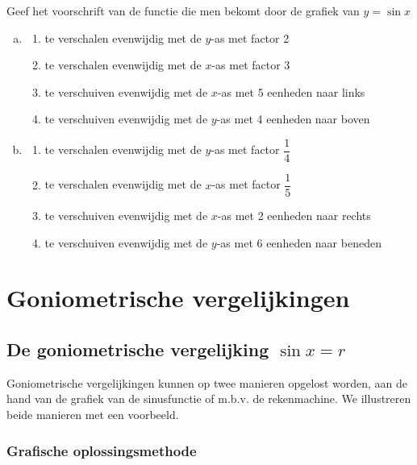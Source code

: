 \documentclass[a4paper,12pt,twoside]{article}
\begin{document}
\begin{oefening}
  Geef het voorschrift van de functie die men bekomt door de grafiek van $y=\sin x$
  \begin{enumerate}[(a)]
  \item
    \begin{enumerate}[$\rightarrow$]
      \itemsep0.8em
    \item te verschalen evenwijdig met de $y$-as met factor 2
    \item te verschalen evenwijdig met de $x$-as met factor 3
    \item te verschuiven evenwijdig met de $x$-as met 5 eenheden naar links
    \item te verschuiven evenwijdig met de $y$-as met 4 eenheden naar boven
    \end{enumerate}
  \item
    \begin{enumerate}[$\rightarrow$]
      \itemsep0.8em
    \item te verschalen evenwijdig met de $y$-as met factor $\dfrac{1}{4}$
    \item te verschalen evenwijdig met de $x$-as met factor $\dfrac{1}{5}$
    \item te verschuiven evenwijdig met de $x$-as met 2 eenheden naar rechts
    \item te verschuiven evenwijdig met de $y$-as met 6 eenheden naar beneden
    \end{enumerate}
  \end{enumerate}
\end{oefening}

\cleardoublepage
\section{Goniometrische vergelijkingen}

\subsection{De goniometrische vergelijking $\sin x=r$}
Goniometrische vergelijkingen kunnen op twee manieren opgelost worden, aan de hand van de grafiek van de sinusfunctie of m.b.v. de rekenmachine. We illustreren beide manieren met een voorbeeld.

\subsubsection*{Grafische oplossingsmethode}
\end{document}
